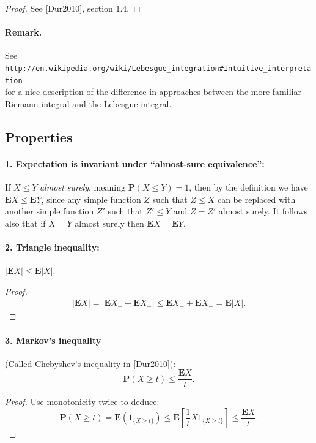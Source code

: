 \documentclass[12pt]{article}
\newcommand{\prob}{\mathbf{P}}
\newcommand{\expec}{\mathbf{E}}
\theoremstyle{example}
\begin{document}
\begin{proof} See [Dur2010], section 1.4.
\end{proof}

\paragraph{Remark.} See \\ \verb+http://en.wikipedia.org/wiki/Lebesgue_integration#Intuitive_interpretation+ \\for a nice description of the difference in approaches between the more familiar Riemann integral and the Lebesgue integral.

\subsection{Properties \label{sec-expec-prop}}

\paragraph{1. Expectation is invariant under ``almost-sure equivalence'':} If $X\le Y$ \emph{almost surely}, meaning $\prob(X\le Y)=1$, then by the definition we have $\expec X \le \expec Y$, since any simple function $Z$ such that $Z\le X$ can be replaced with another simple function $Z'$ such that $Z'\le Y$ and $Z=Z'$ almost surely. It follows also that if $X=Y$ almost surely then $\expec X=\expec Y$.

\paragraph{2. Triangle inequality:} $ |\expec X| \le \expec |X|$.
\begin{proof}
$$|\expec X| = |\expec X_+ - \expec X_- |  \le \expec X_+ + \expec X_- = \expec |X|. $$
\end{proof}


\paragraph{3. Markov's inequality} (Called Chebyshev's inequality in [Dur2010]):
$$ \prob(X \ge t) \le \frac{\expec X}{t}. $$

\begin{proof} Use monotonicity twice to deduce:
$$ \prob(X \ge t) = \expec(1_{\{X\ge t\}}) \le \expec\left[ \frac{1}{t} X 1_{\{X\ge t\}} \right] \le \frac{\expec X}{t}. $$
\end{proof}
\end{document}
